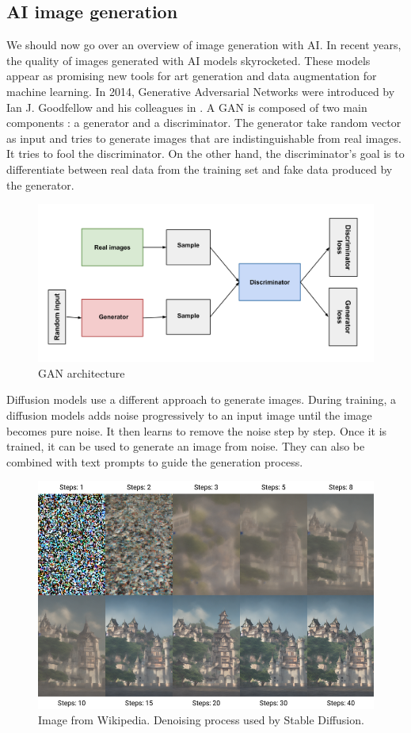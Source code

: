 \documentclass[12pt,a4paper]{article}
\begin{document}
\subsection{AI image generation}
We should now go over an overview of image generation with AI. In recent years, the quality of images generated with AI models skyrocketed. These models appear as promising new tools for art generation and data augmentation for machine learning. In 2014, Generative Adversarial Networks were introduced by Ian J. Goodfellow and his colleagues in \autocite*{goodfellowGenerativeAdversarialNetworks2014}. A GAN is composed of two main components : a generator and a discriminator. The generator take random vector as input and tries to generate images that are indistinguishable from real images. It tries to fool the discriminator. On the other hand, the discriminator's goal is to differentiate between real data from the training set and fake data produced by the generator.
\begin{figure}[H]
    \centering
    \includegraphics[width=\textwidth]{img/GAN.png}
    \caption{GAN architecture}
\end{figure}

Diffusion models use a different approach to generate images. During training, a diffusion models adds noise progressively to an input image until the image becomes pure noise. It then learns to remove the noise step by step. Once it is trained, it can be used to generate an image from noise. They can also be combined with text prompts to guide the generation process.
\begin{figure}[H]
    \includegraphics*[width=\textwidth]{img/diffusion.png}
    \caption{Image from Wikipedia. Denoising process used by Stable Diffusion.}
\end{figure}
\end{document}

